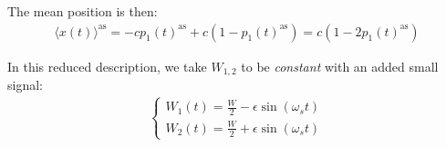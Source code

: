 \documentclass[../template.tex]{subfiles}
\begin{document}

The mean position is then:
\begin{align*}
    \langle x(t) \rangle^{\mathrm{as}} = -c p_1(t)^{\mathrm{as} } + c (1-p_1(t)^{\mathrm{as}}) = c(1-2p_1(t)^{\mathrm{as}})
\end{align*}

In this reduced description, we take $W_{1,2}$ to be \textit{constant} with an added small signal:
\begin{align*}
    \begin{cases}
        W_1(t) = \frac{W}{2} - \epsilon \sin (\omega_s t)\\
        W_2(t) = \frac{W}{2} + \epsilon \sin (\omega_s t) 
    \end{cases}
\end{align*} 
\end{document}
